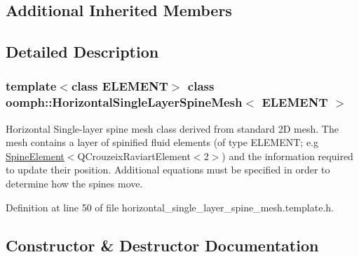 \subsection*{Additional Inherited Members}


\subsection{Detailed Description}
\subsubsection*{template$<$class E\+L\+E\+M\+E\+NT$>$\newline
class oomph\+::\+Horizontal\+Single\+Layer\+Spine\+Mesh$<$ E\+L\+E\+M\+E\+N\+T $>$}

Horizontal Single-\/layer spine mesh class derived from standard 2D mesh. The mesh contains a layer of spinified fluid elements (of type E\+L\+E\+M\+E\+NT; e.\+g \hyperlink{classoomph_1_1SpineElement}{Spine\+Element}$<$Q\+Crouzeix\+Raviart\+Element$<$2$>$) and the information required to update their position. Additional equations must be specified in order to determine how the spines move. 

Definition at line 50 of file horizontal\+\_\+single\+\_\+layer\+\_\+spine\+\_\+mesh.\+template.\+h.



\subsection{Constructor \& Destructor Documentation}
\mbox{\label{classoomph_1_1HorizontalSingleLayerSpineMesh_a765856597150d37a20eabdb53e58d49c}} 
